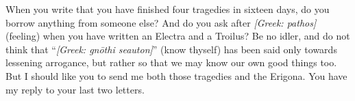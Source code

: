  When you write that you have finished four tragedies in sixteen days, do you borrow anything from someone else? And do you ask after \textit{[Greek: pathos]} (feeling) when you have written an Electra and a Troilus? Be no idler, and do not think that ``\textit{[Greek: gn\=othi seauton]}'' (know thyself) has been said only towards lessening arrogance, but rather so that we may know our own good things too. But I should like you to send me both those tragedies and the Erigona. You have my reply to your last two letters.

